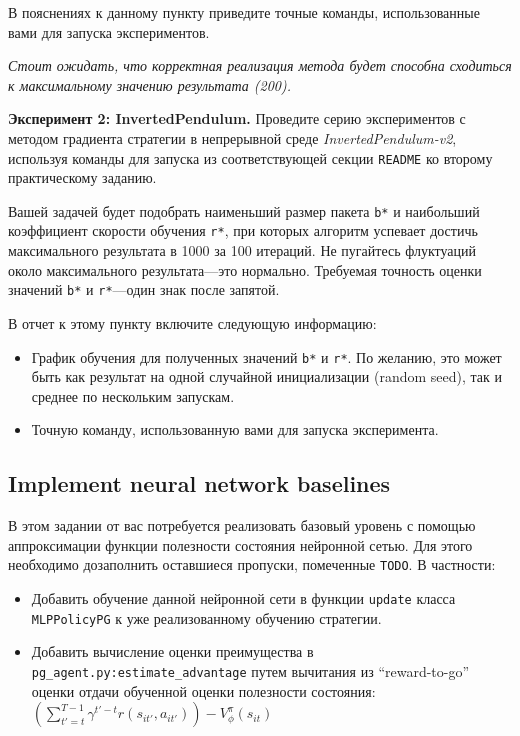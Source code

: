\documentclass[12pt, oneside]{article}
\begin{document}
В пояснениях к данному пункту приведите точные команды, использованные вами для запуска экспериментов.

\textit{Стоит ожидать, что корректная реализация метода будет способна сходиться к максимальному значению результата (200).}

\textbf{Эксперимент 2: InvertedPendulum.} Проведите серию экспериментов с методом градиента стратегии в непрерывной среде \textit{InvertedPendulum-v2}, используя команды для запуска из соответствующей секции \verb|README| ко второму практическому заданию.

Вашей задачей будет подобрать наименьший размер пакета \verb|b*| и наибольший коэффициент скорости обучения \verb|r*|, при которых алгоритм успевает достичь максимального результата в 1000 за 100 итераций. Не пугайтесь флуктуаций около максимального результата---это нормально. Требуемая точность оценки значений \verb|b*| и \verb|r*|---один знак после запятой.

В отчет к этому пункту включите следующую информацию:

\begin{itemize}
    \item График обучения для полученных значений \verb|b*| и \verb|r*|. По желанию, это может быть как результат на одной случайной инициализации (random seed), так и среднее по нескольким запускам.
    \item Точную команду, использованную вами для запуска эксперимента.
\end{itemize}

\subsection{Implement neural network baselines}

В этом задании от вас потребуется реализовать базовый уровень с помощью аппроксимации функции полезности состояния нейронной сетью. Для этого необходимо дозаполнить оставшиеся пропуски, помеченные \verb|TODO|. В частности:

\begin{itemize}
    \item Добавить обучение данной нейронной сети в функции \verb|update| класса \verb|MLPPolicyPG| к уже реализованному обучению стратегии.
    \item Добавить вычисление оценки преимущества в \verb|pg_agent.py:estimate_advantage| путем вычитания из ``reward-to-go'' оценки отдачи обученной оценки полезности состояния: $\left( \sum_{t' = t}^{T - 1} {\gamma^{t'-t} r(s_{it'}, a_{it'})} \right) - V_\phi^\pi (s_{it})$
\end{itemize}
\end{document}
